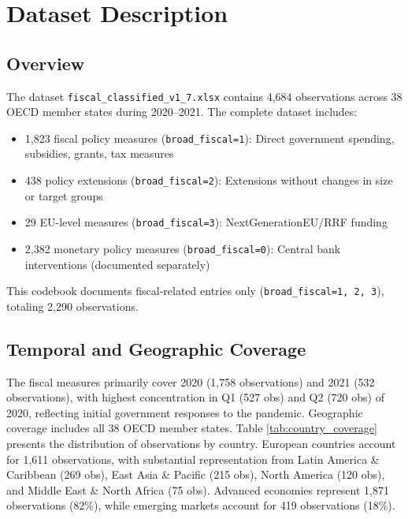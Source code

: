 \documentclass[12pt]{article}
\begin{document}
\section{Dataset Description}

\subsection{Overview}

The dataset \texttt{fiscal\_classified\_v1\_7.xlsx} contains 4,684 observations across 38 OECD member states during 2020--2021. The complete dataset includes:

\begin{itemize}
\item 1,823 fiscal policy measures (\texttt{broad\_fiscal=1}): Direct government spending, subsidies, grants, tax measures
\item 438 policy extensions (\texttt{broad\_fiscal=2}): Extensions without changes in size or target groups
\item 29 EU-level measures (\texttt{broad\_fiscal=3}): NextGenerationEU/RRF funding
\item 2,382 monetary policy measures (\texttt{broad\_fiscal=0}): Central bank interventions (documented separately)
\end{itemize}

This codebook documents fiscal-related entries only (\texttt{broad\_fiscal=1, 2, 3}), totaling 2,290 observations.

\subsection{Temporal and Geographic Coverage}

The fiscal measures primarily cover 2020 (1,758 observations) and 2021 (532 observations), with highest concentration in Q1 (527 obs) and Q2 (720 obs) of 2020, reflecting initial government responses to the pandemic. Geographic coverage includes all 38 OECD member states. Table \ref{tab:country_coverage} presents the distribution of observations by country. European countries account for 1,611 observations, with substantial representation from Latin America \& Caribbean (269 obs), East Asia \& Pacific (215 obs), North America (120 obs), and Middle East \& North Africa (75 obs). Advanced economies represent 1,871 observations (82\%), while emerging markets account for 419 observations (18\%).
\end{document}
